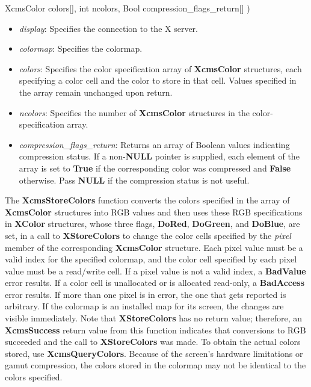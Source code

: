 \documentclass{report}
\begin{document}
\begin{itemize}
\begin{cppcode}
                    XcmsColor colors[],
                    int ncolors,
                    Bool compression_flags_return[]
                )
            \end{cppcode}
            \bigbreak \noindent
            \begin{itemize}
                \item \textit{display}: Specifies the connection to the X server.
                \item \textit{colormap}: Specifies the colormap.
                \item \textit{colors}: Specifies the color specification array of \textbf{XcmsColor} structures, each specifying a color cell and the color to store in that cell. Values specified in the array remain unchanged upon return.
                \item \textit{ncolors}: Specifies the number of \textbf{XcmsColor} structures in the color-specification array.
                \item \textit{compression\_flags\_return}: Returns an array of Boolean values indicating compression status. If a non-\textbf{NULL} pointer is supplied, each element of the array is set to \textbf{True} if the corresponding color was compressed and \textbf{False} otherwise. Pass \textbf{NULL} if the compression status is not useful.
            \end{itemize}
            \noindent
            The \textbf{XcmsStoreColors} function converts the colors specified in the array of \textbf{XcmsColor} structures into RGB values and then uses these RGB specifications in \textbf{XColor} structures, whose three flags, \textbf{DoRed}, \textbf{DoGreen}, and \textbf{DoBlue}, are set, in a call to \textbf{XStoreColors} to change the color cells specified by the \textit{pixel} member of the corresponding \textbf{XcmsColor} structure.
            \bigbreak \noindent
            Each pixel value must be a valid index for the specified colormap, and the color cell specified by each pixel value must be a read/write cell. If a pixel value is not a valid index, a \textbf{BadValue} error results. If a color cell is unallocated or is allocated read-only, a \textbf{BadAccess} error results. If more than one pixel is in error, the one that gets reported is arbitrary. If the colormap is an installed map for its screen, the changes are visible immediately.
            \bigbreak \noindent
            Note that \textbf{XStoreColors} has no return value; therefore, an \textbf{XcmsSuccess} return value from this function indicates that conversions to RGB succeeded and the call to \textbf{XStoreColors} was made. To obtain the actual colors stored, use \textbf{XcmsQueryColors}. Because of the screen's hardware limitations or gamut compression, the colors stored in the colormap may not be identical to the colors specified.

\end{itemize}
\end{document}
